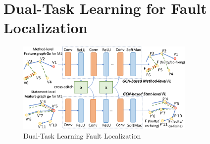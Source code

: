 \section{Dual-Task Learning for Fault Localization}
\label{sec:dual-learning}

\begin{figure}[t]
	\centering
	\includegraphics[width=3.4in]{graphs/dual-learning-3.png}
        \vspace{-18pt}
	\caption{Dual-Task Learning Fault Localization}
	\label{dual-learning}
\end{figure}




